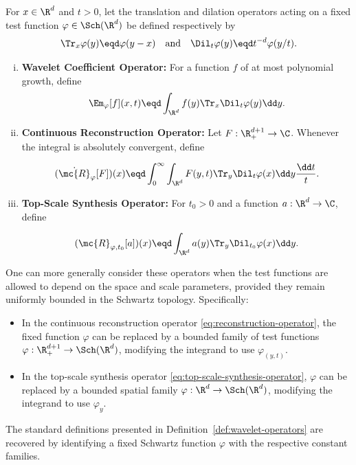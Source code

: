 \begin{definition} \label{def:wavelet-operators} For $x \in \R^d$ and $t > 0$, let the translation and dilation operators acting on a fixed test function $\varphi \in \Sch(\R^d)$ be defined respectively by
\[
\Tr_x\varphi(y) \eqd \varphi(y-x) \quad \text{and} \quad \Dil_t\varphi(y) \eqd t^{-d}\varphi(y/t).
\]
\begin{enumerate}[(i)] \item \textbf{Wavelet Coefficient Operator:} For a function $f$ of at most polynomial growth, define
\begin{equation} \label{eq:wavelet-coefficient-fixed-test}
\Em_{\varphi}[f](x,t) \eqd \int_{\R^d} f(y)\Tr_x\Dil_t\varphi(y)\dd y.
\end{equation}

\item \textbf{Continuous Reconstruction Operator:} Let $F:\R^{d+1}_+\to\C$.
Whenever the integral is absolutely convergent, define

\begin{equation} \label{eq:reconstruction-operator}
(\dot{\mc{R}}_{\varphi}[F])(x) \eqd \int_0^\infty \int_{\R^d} F(y,t)\Tr_y\Dil_t\varphi(x) \dd y\frac{\dd t}{t}.
\end{equation}

\item \textbf{Top-Scale Synthesis Operator:} For $t_0>0$ and a function $a:\R^d\to\C$, define

\begin{equation} \label{eq:top-scale-synthesis-operator}
(\mc{R}_{\varphi,t_0}[a])(x) \eqd \int_{\R^d} a(y)\Tr_y\Dil_{t_0}\varphi(x)\dd y.
\end{equation}
\end{enumerate}
\end{definition}

\begin{remark} \label{rem:variable-test-functions} One can more generally consider these operators when the test functions are allowed to depend on the space and scale parameters, provided they remain uniformly bounded in the Schwartz topology.
Specifically:
\begin{itemize}
\item In the continuous reconstruction operator \eqref{eq:reconstruction-operator}, the fixed function $\varphi$ can be replaced by a bounded family of test functions $\varphi: \R^{d+1}_+ \to \Sch(\R^d)$, modifying the integrand to use $\varphi_{(y,t)}$.
\item In the top-scale synthesis operator \eqref{eq:top-scale-synthesis-operator}, $\varphi$ can be replaced by a bounded spatial family $\varphi: \R^d \to \Sch(\R^d)$, modifying the integrand to use $\varphi_y$.
\end{itemize}
The standard definitions presented in Definition~\ref{def:wavelet-operators} are recovered by identifying a fixed Schwartz function $\varphi$ with the respective constant families.
\end{remark}
